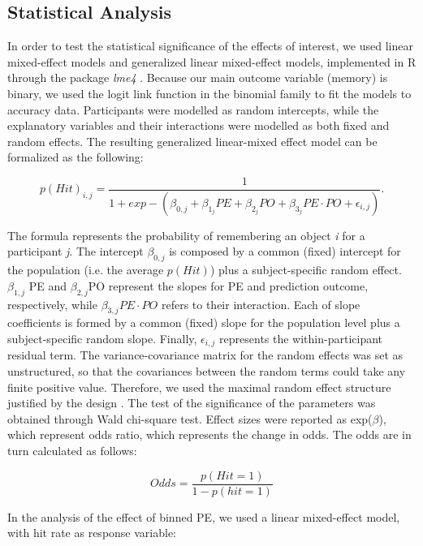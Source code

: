 \documentclass[a4paper,12pt]{article}
\begin{document}
\subsection{Statistical Analysis}
In order to test the statistical significance of the effects of interest, we used linear mixed-effect models and generalized linear mixed-effect models, implemented in R through the package \textit{lme4} \citep{bates2014fitting}. Because our main outcome variable (memory) is binary, we used the logit link function in the binomial family to fit the models to accuracy data. Participants were modelled as random intercepts, while the explanatory variables and their interactions were modelled as both fixed and random effects. The resulting generalized linear-mixed effect model can be formalized as the following:

\begin{equation}
p(Hit)_{i,j} =   \dfrac{1}{1+exp - (\beta_{0,j} +\beta_{1_j} PE +\beta_{2_j} PO + \beta_{3_j} PE \cdot PO + \epsilon_{i,j} )}.
\end{equation}

\noindent
The formula represents the probability of remembering an object \textit{i} for a participant \textit{j}. The intercept $\beta_{0,j}$ is composed by a common (fixed) intercept for the population (i.e. the average $p(Hit)$) plus a subject-specific random effect. $\beta_{1,j}$ PE and $\beta_{2, j}$PO represent the slopes for PE and prediction outcome, respectively, while  $\beta_{3, j} PE \cdot PO$  refers to their interaction. Each of slope coefficients is formed by a common (fixed) slope for the population level plus a subject-specific random slope. Finally, $\epsilon_{i,j}$ represents the within-participant residual term.
The variance-covariance matrix for the random effects was set as unstructured, so that the covariances between the random terms could take any finite positive value.  Therefore, we used the maximal random effect structure justified by the design \citep{barr2013random}. The test of the significance of the parameters was obtained through Wald chi-square test. Effect sizes were reported as exp($\beta$), which represent odds ratio, which represents the change in odds. The odds are in turn calculated as follows:

\begin{equation}
Odds =   \dfrac{p(Hit=1)}{1-p(hit=1)}
\end{equation}

\noindent
In the analysis of the effect of binned PE, we used a linear mixed-effect model, with hit rate as response variable:
\end{document}
